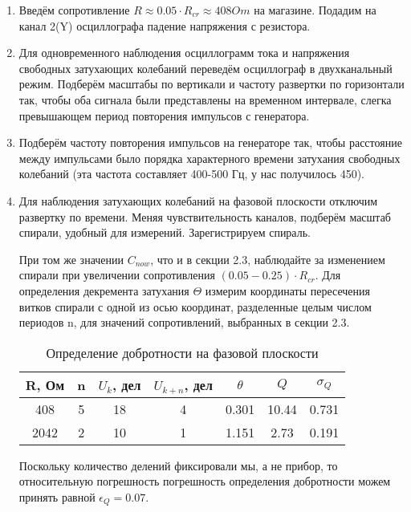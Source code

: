 \documentclass[a4paper,12pt]{article} %
\begin{document}
\begin{enumerate}
    \item  Введём сопротивление $R \approx 0.05 \cdot R_{cr} \approx 408 Om$ на магазине. Подадим на канал 2(Y) осциллографа падение напряжения с резистора.

    \item Для одновременного наблюдения осциллограмм тока и напряжения свободных затухающих колебаний переведём осциллограф в двухканальный режим. Подберём масштабы по вертикали и частоту развертки по горизонтали так, чтобы оба сигнала были представлены на временном интервале, слегка превышающем период повторения импульсов с генератора.

    \item Подберём частоту повторения импульсов на генераторе так, чтобы расстояние между импульсами было порядка характерного времени затухания свободных колебаний (эта частота составляет 400-500 Гц, у нас получилось 450).

    \item Для наблюдения затухающих колебаний на фазовой плоскости отключим развертку по времени. Меняя чувствительность каналов, подберём масштаб спирали, удобный для измерений. Зарегистрируем спираль. 
    
    При том же значении $C_{now}$, что и в секции 2.3, наблюдайте за изменением спирали при увеличении сопротивления $(0.05 - 0.25) \cdot R_{cr}$.
    Для определения декремента затухания $\Theta$ измерим координаты пересечения
    витков спирали с одной из осью координат, разделенные целым числом периодов n, для значений сопротивлений, выбранных в секции 2.3.

    \begin{table}[h]
		\centering
		\begin{tabular}{|c|c|c|c|c|c|c|}
			\hline
			R, Ом & n & $U_k$, дел & $U_{k + n}$, дел & $\theta$ & $Q$ & $\sigma_{Q}$  \\ \hline
			408 & 5 & 18 & 4 & 0.301 & 10.44 & 0.731 \\ \hline
			2042 & 2 & 10 & 1 & 1.151 & 2.73 & 0.191 \\ \hline 
		\end{tabular}
		\caption{Определение добротности на фазовой плоскости}
	\end{table}

    Поскольку количество делений фиксировали мы, а не прибор, то относительную погрешность погрешность определения добротности можем принять равной $\epsilon_{Q} = 0.07$.

\end{enumerate}
\end{document}
